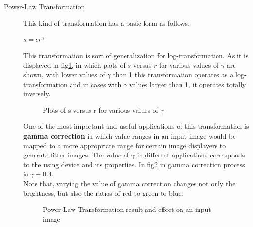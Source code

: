 \documentclass{article}
\begin{document}
\begin{description}
 \item [Power-Law Transformation] This kind of transformation has a basic form as follows.\\
\begin{center}
$s = cr^\gamma$
\end{center} 
This transformation is sort of generalization for log-transformation. As it is displayed in fig\ref{fig:powerDiag}, in which plots of $s$ versus $r$ for various
values of $\gamma$ are shown, with lower values of $\gamma$ than 1 this transformation operates as a log-transformation and in cases with $\gamma$ values larger than 1, it operates totally inversely.

\begin{figure}[h]
\center
{}
\caption{Plots of s versus r for various values of $\gamma$}
\label{fig:powerDiag}
\end{figure}

 One of the most important and useful applications of this transformation is \textbf{gamma correction} in which value ranges in an input image would be mapped to a more appropriate range for certain image displayers to generate fitter images. The value of $\gamma$ in different applications corresponds to the using device and its properties. In fig\ref{fig:gamma0.4} in gamma correction process is $\gamma = 0.4$.\\
 Note that,  varying the value of gamma correction changes not only the brightness, but also the ratios of red to green to blue.\\
 
 \begin{figure}[h]
 \center
 \caption{Power-Law Transformation result and effect on an input image}
 \label{fig:gamma0.4}
 \end{figure}



\end{description}
\end{document}
